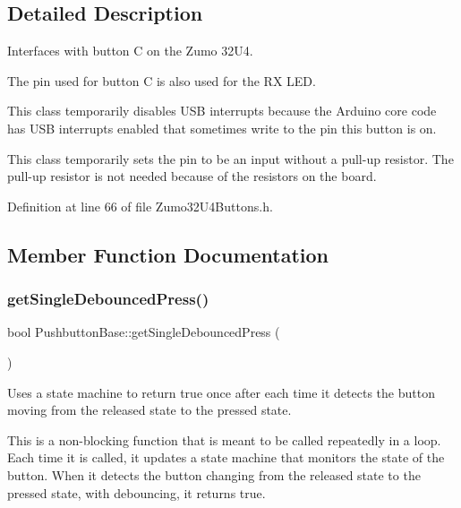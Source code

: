 \subsection{Detailed Description}
Interfaces with button C on the Zumo 32\+U4. 

The pin used for button C is also used for the RX L\+ED.

This class temporarily disables U\+SB interrupts because the Arduino core code has U\+SB interrupts enabled that sometimes write to the pin this button is on.

This class temporarily sets the pin to be an input without a pull-\/up resistor. The pull-\/up resistor is not needed because of the resistors on the board. 

Definition at line 66 of file Zumo32\+U4\+Buttons.\+h.



\subsection{Member Function Documentation}
\mbox{\label{class_pushbutton_base_a93953875c8b1c5f69dec3984774de296}} 
\subsubsection{\texorpdfstring{get\+Single\+Debounced\+Press()}{getSingleDebouncedPress()}}
{\footnotesize\ttfamily bool Pushbutton\+Base\+::get\+Single\+Debounced\+Press (\begin{DoxyParamCaption}{ }\end{DoxyParamCaption})\hspace{0.3cm}{\ttfamily [inherited]}}



Uses a state machine to return true once after each time it detects the button moving from the released state to the pressed state. 

This is a non-\/blocking function that is meant to be called repeatedly in a loop. Each time it is called, it updates a state machine that monitors the state of the button. When it detects the button changing from the released state to the pressed state, with debouncing, it returns true. 

